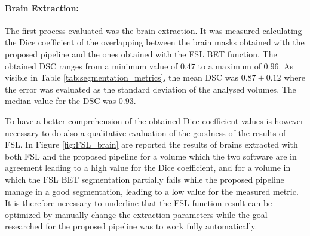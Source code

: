 \documentclass{standalone}
\begin{document}
\paragraph{Brain Extraction:} 
The first process evaluated was the brain extraction. It was measured calculating the Dice coefficient of the overlapping between the brain masks obtained with the proposed pipeline and the ones obtained with the FSL BET function. 
The obtained DSC ranges from a minimum value of $0.47$ to a maximum of $0.96$. As visible in Table \ref{tab:segmentation_metrics}, the mean DSC was $0.87 \pm 0.12$ where the error was evaluated as the standard deviation of the analysed volumes.
The median value for the DSC was $0.93$.


To have a better comprehension of the obtained Dice coefficient values is however necessary to do also a qualitative evaluation of the goodness of the results of FSL. In Figure \ref{fig:FSL_brain} are reported the results of brains extracted with both FSL and the proposed pipeline for a volume which the two software are in agreement leading to a high value for the Dice coefficient, and for a volume in which the FSL BET segmentation partially fails while the proposed pipeline manage in a good segmentation, leading to a low value for the measured metric.
It is therefore necessary to underline that the FSL function result can be optimized by manually change the extraction parameters while the goal researched for the proposed pipeline was to work fully automatically.
\end{document}
